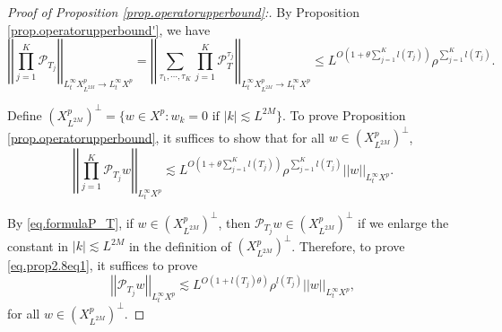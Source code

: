 \begin{proof}[Proof of Proposition \ref{prop.operatorupperbound}:] By Proposition \ref{prop.operatorupperbound'}, we have
\begin{equation}
    \left|\left|\prod_{j=1}^K\mathcal{P}_{T_j}\right|\right|_{L_t^{\infty}X^p_{L^{2M}}\rightarrow L_t^{\infty}X^p}=\left|\left|\sum_{\tau_1,\cdots,\tau_K}\prod_{j=1}^K\mathcal{P}^{\tau_j}_{T}\right|\right|_{L_t^{\infty}X^{p}_{L^{2M}}\rightarrow L_t^{\infty}X^{p}}\le L^{O\left(1+\theta \sum_{j=1}^K l(T_j)\right)} \rho^{\sum_{j=1}^K l(T_j)}.
\end{equation}

Define $\left(X^{p}_{L^{2M}}\right)^{\perp}=\{w\in X^p: w_k=0\text{ if }|k|\lesssim L^{2M}\}$. To prove Proposition \ref{prop.operatorupperbound}, it suffices to show that for all $w\in \left(X^{p}_{L^{2M}}\right)^{\perp}$,
\begin{equation}\label{eq.prop2.8eq1}
    \left|\left|\prod_{j=1}^K\mathcal{P}_{T_j}w\right|\right|_{L_t^{\infty}X^p}\lesssim L^{O\left(1+\theta \sum_{j=1}^K l(T_j)\right)} \rho^{\sum_{j=1}^K l(T_j)} \left|\left|w\right|\right|_{L_t^{\infty}X^p}.
\end{equation}

By \eqref{eq.formulaP_T}, if $w\in \left(X^{p}_{L^{2M}}\right)^{\perp}$, then $\mathcal{P}_{T_j} w\in \left(X^{p}_{L^{2M}}\right)^{\perp}$ if we enlarge the constant in $|k|\lesssim L^{2M}$ in the definition of $\left(X^{p}_{L^{2M}}\right)^{\perp}$. Therefore, to prove \eqref{eq.prop2.8eq1}, it suffices to prove
\begin{equation}\label{eq.prop2.8eq2}
    \left|\left|\mathcal{P}_{T_j}w\right|\right|_{L_t^{\infty}X^p}\lesssim L^{O(1+l(T_j)\theta)} \rho^{l(T_j)} \left|\left|w\right|\right|_{L_t^{\infty}X^p},
\end{equation}
for all $w\in \left(X^{p}_{L^{2M}}\right)^{\perp}$.


\end{proof}
